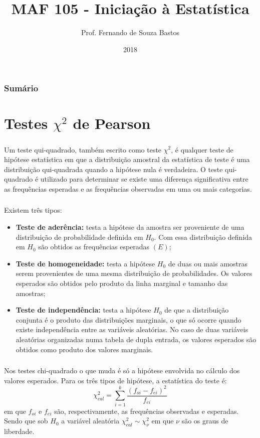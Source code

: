 \documentclass[14pt,aspectratio=1610]{beamer}
\title{MAF 105 - Iniciação à Estatística}
\author{Prof. Fernando de Souza Bastos}
\institute{Instituto de Ciências Exatas e Tecnológicas\texorpdfstring{\\ Universidade Federal de Viçosa}{}\texorpdfstring{\\ Campus UFV - Florestal}{}}
\date{2018}
\newcommand{\Ho}{\ensuremath{H_{0}}}
\begin{document}


\frame{\titlepage}

\begin{frame}{}
\frametitle{\bf Sumário}
\tableofcontents
\end{frame}

\section{Testes $\chi^{2}$ de Pearson}
\begin{frame}{}
\frametitle{}
\begin{block}{}
\justifying
Um teste qui-quadrado, também escrito como teste $\chi^{2}$, é qualquer teste de hipótese estatística em que a distribuição amostral da estatística de teste é uma distribuição qui-quadrada quando a hipótese nula é verdadeira. O teste qui-quadrado é utilizado para determinar se existe uma diferença significativa entre as frequências esperadas e as frequências observadas em uma ou mais categorias.
\end{block}
\end{frame}

\begin{frame}{}
\frametitle{}
\begin{block}{}
\justifying
Existem três tipos:
\begin{itemize}
\item {\bf Teste de aderência:} testa a hipótese da amostra ser proveniente de uma distribuição de probabilidade definida em $\Ho.$ Com essa distribuição definida em $\Ho$ são obtidos as frequências esperadas $(E);$\pause
\item {\bf Teste de homogeneidade:} testa a hipótese $\Ho$ de duas ou mais amostras serem provenientes de uma mesma distribuição de probabilidades. Os valores esperados são obtidos pelo produto da linha marginal e tamanho das amostras;\pause
\item {\bf Teste de independência:} testa a hipótese $\Ho$ de que a distribuição conjunta é o produto das distribuições marginais, o que só ocorre quando existe independência entre as variáveis aleatórias. No caso de duas variáveis aleatórias organizadas numa tabela de dupla entrada, os valores esperados são obtidos como produto dos valores marginais.
\end{itemize}
\end{block}
\end{frame}

\begin{frame}{}
\frametitle{}
\begin{block}{}
\justifying
Nos testes chi-quadrado o que muda é só a hipótese envolvida no cálculo dos valores esperados. Para os três tipos de hipótese, a estatística do teste é:
$$\chi^{2}_{cal}={\displaystyle \sum_{i=1}^{k}\dfrac{(f_{oi}-f_{ei})^{2}}{f_{ei}}}$$
em que $f_{oi}$ e $f_{ei}$ são, respectivamente, as frequências observadas e esperadas. Sendo que sob $\Ho$ a variável aleatória $\chi^{2}_{cal}\sim \chi^{2}_{\nu}$ em que $\nu$ são os graus de liberdade.

\end{block}
\end{frame}
\end{document}
